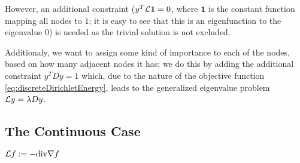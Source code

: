However, an additional constraint ($y^T\mathcal{L}\mathbf{1}=0$, where $\mathbf{1}$ is the constant function mapping all nodes to $1$; it is easy to see that this is an eigenfunction to the eigenvalue $0$) is needed as the trivial solution is not excluded.

Additionaly, we want to assign some kind of importance to each of the nodes, based on how many adjacent nodes it has; we do this by adding the additional constraint $y^TDy=1$ which, due to the nature of the objective function \eqref{eq:discreteDirichletEnergy}, leads to the generalized eigenvalue problem $\mathcal{L} y=\lambda Dy$.


\subsection{The Continuous Case}
\begin{definition}
    $\mathcal{L} f:=-\mathrm{div}\nabla f$
\end{definition}